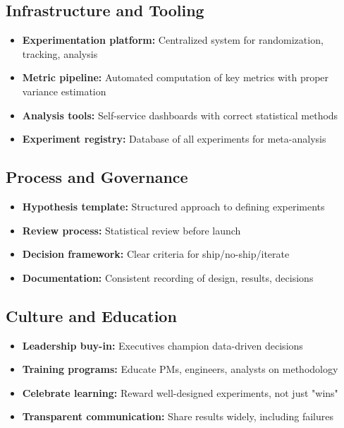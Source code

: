 \subsection{Infrastructure and Tooling}

\begin{itemize}
    \item \textbf{Experimentation platform:} Centralized system for randomization, tracking, analysis
    \item \textbf{Metric pipeline:} Automated computation of key metrics with proper variance estimation
    \item \textbf{Analysis tools:} Self-service dashboards with correct statistical methods
    \item \textbf{Experiment registry:} Database of all experiments for meta-analysis
\end{itemize}

\subsection{Process and Governance}

\begin{itemize}
    \item \textbf{Hypothesis template:} Structured approach to defining experiments
    \item \textbf{Review process:} Statistical review before launch
    \item \textbf{Decision framework:} Clear criteria for ship/no-ship/iterate
    \item \textbf{Documentation:} Consistent recording of design, results, decisions
\end{itemize}

\subsection{Culture and Education}

\begin{itemize}
    \item \textbf{Leadership buy-in:} Executives champion data-driven decisions
    \item \textbf{Training programs:} Educate PMs, engineers, analysts on methodology
    \item \textbf{Celebrate learning:} Reward well-designed experiments, not just "wins"
    \item \textbf{Transparent communication:} Share results widely, including failures
\end{itemize}

